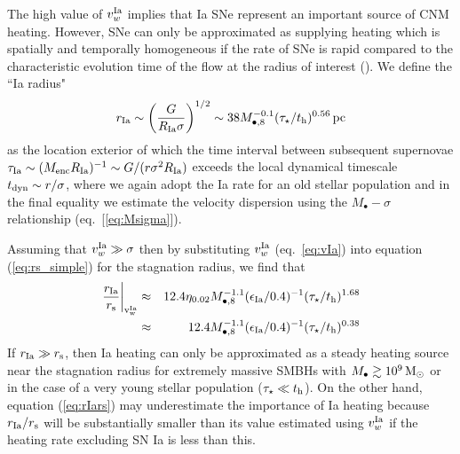 \documentclass[usenatbib,fleqn]{mn2e}
\begin{document}
The high value of $v_{w}^{\rm Ia}$ implies that Ia SNe represent an important source of CNM heating.  However, SNe can only be approximated as supplying heating which is spatially and temporally homogeneous if the rate of SNe is rapid compared to the characteristic evolution time of the flow at the radius of interest (\citealt{ShcherbakovWong+:2014a}).  We define the ``Ia radius"
  \begin{align}
    r_{\rm Ia} \sim \left(\frac{G}{R_{\rm Ia}\sigma}\right)^{1/2} \sim
    38 M_{\bullet,8}^{-0.1}(\tau_{\star}/t_{\rm h})^{0.56}\,{\rm pc}
    \label{eq:rIa}
  \end{align}
as the location exterior of which the time interval between subsequent supernovae $\tau_{\rm Ia} \sim (M_{\rm enc}R_{\rm Ia})^{-1} \sim G/(r\sigma^{2}R_{\rm Ia})$ exceeds the local dynamical timescale $t_{\rm
dyn} \sim r/\sigma$, where we again adopt the Ia rate for an old stellar population and in the final equality we estimate the velocity dispersion using the $M_{\bullet}-\sigma$ relationship
(eq.~[\ref{eq:Msigma}]).  

Assuming that $v_{w}^{\rm Ia} \gg \sigma$ then by substituting $v_{w}^{\rm Ia}$ (eq.~\ref{eq:vIa}) into equation (\ref{eq:rs_simple}) for the stagnation radius, we find that
\begin{eqnarray}
\left.\frac{r_{\rm Ia}}{r_{\rm s}}\right|_{\rm v_{w}^{\rm Ia}} &\approx& 12.4\eta_{0.02} M_{\bullet,8}^{-1.1}(\epsilon_{\rm Ia}/0.4)^{-1}(\tau_{\star}/t_{\rm h})^{1.68} \nonumber \\
&\approx& 12.4M_{\bullet,8}^{-1.1}(\epsilon_{\rm Ia}/0.4)^{-1}(\tau_{\star}/t_{\rm h})^{0.38}
\label{eq:rIars}
\end{eqnarray}
If $r_{\rm Ia} \gg r_{\rm s}$, then Ia heating can only be approximated as a steady heating source near the stagnation radius for extremely massive SMBHs with $M_{\bullet} \gtrsim 10^9 \,{\rm M_\odot}$ or in the case of a very young stellar population ($\tau_{\star} \ll t_{\rm h}$).  On the other hand, equation (\ref{eq:rIars}) may underestimate the importance of Ia heating because $r_{\rm Ia}/r_{\rm s}$ will be substantially smaller than its value estimated using $v_{w}^{\rm Ia}$ if the heating rate excluding SN Ia is less than this.  
\end{document}

